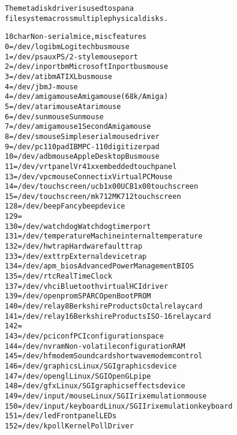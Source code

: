 \documentclass[a4paper,8pt,english]{sphinxmanual}
\begin{document}
\begin{alltt}
                The metadisk driver is used to span a
                filesystem across multiple physical disks.

  10 char       Non-serial mice, misc features
                  0 = /dev/logibm       Logitech bus mouse
                  1 = /dev/psaux        PS/2-style mouse port
                  2 = /dev/inportbm     Microsoft Inport bus mouse
                  3 = /dev/atibm        ATI XL bus mouse
                  4 = /dev/jbm          J-mouse
                  4 = /dev/amigamouse   Amiga mouse (68k/Amiga)
                  5 = /dev/atarimouse   Atari mouse
                  6 = /dev/sunmouse     Sun mouse
                  7 = /dev/amigamouse1  Second Amiga mouse
                  8 = /dev/smouse       Simple serial mouse driver
                  9 = /dev/pc110pad     IBM PC-110 digitizer pad
                 10 = /dev/adbmouse     Apple Desktop Bus mouse
                 11 = /dev/vrtpanel     Vr41xx embedded touch panel
                 13 = /dev/vpcmouse     Connectix Virtual PC Mouse
                 14 = /dev/touchscreen/ucb1x00  UCB 1x00 touchscreen
                 15 = /dev/touchscreen/mk712    MK712 touchscreen
                128 = /dev/beep         Fancy beep device
                129 =
                130 = /dev/watchdog     Watchdog timer port
                131 = /dev/temperature  Machine internal temperature
                132 = /dev/hwtrap       Hardware fault trap
                133 = /dev/exttrp       External device trap
                134 = /dev/apm\_bios     Advanced Power Management BIOS
                135 = /dev/rtc          Real Time Clock
                137 = /dev/vhci         Bluetooth virtual HCI driver
                139 = /dev/openprom     SPARC OpenBoot PROM
                140 = /dev/relay8       Berkshire Products Octal relay card
                141 = /dev/relay16      Berkshire Products ISO-16 relay card
                142 =
                143 = /dev/pciconf      PCI configuration space
                144 = /dev/nvram        Non-volatile configuration RAM
                145 = /dev/hfmodem      Soundcard shortwave modem control
                146 = /dev/graphics     Linux/SGI graphics device
                147 = /dev/opengl       Linux/SGI OpenGL pipe
                148 = /dev/gfx          Linux/SGI graphics effects device
                149 = /dev/input/mouse  Linux/SGI Irix emulation mouse
                150 = /dev/input/keyboard Linux/SGI Irix emulation keyboard
                151 = /dev/led          Front panel LEDs
                152 = /dev/kpoll        Kernel Poll Driver

\end{alltt}
\end{document}
